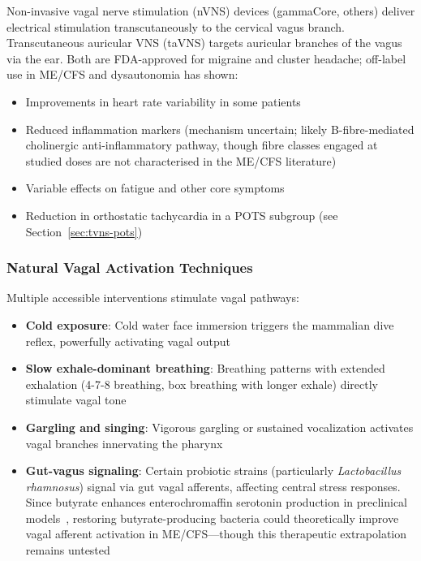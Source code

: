 Non-invasive vagal nerve stimulation (nVNS) devices (gammaCore, others) deliver electrical stimulation transcutaneously to the cervical vagus branch. Transcutaneous auricular VNS (taVNS) targets auricular branches of the vagus via the ear. Both are FDA-approved for migraine and cluster headache; off-label use in ME/CFS and dysautonomia has shown:
\begin{itemize}
    \item Improvements in heart rate variability in some patients
    \item Reduced inflammation markers (mechanism uncertain; likely B-fibre-mediated cholinergic anti-inflammatory pathway, though fibre classes engaged at studied doses are not characterised in the ME/CFS literature)
    \item Variable effects on fatigue and other core symptoms
    \item Reduction in orthostatic tachycardia in a POTS subgroup (see Section~\ref{sec:tvns-pots})
\end{itemize}

\subsubsection{Natural Vagal Activation Techniques}

Multiple accessible interventions stimulate vagal pathways:
\begin{itemize}
    \item \textbf{Cold exposure}: Cold water face immersion triggers the mammalian dive reflex, powerfully activating vagal output
    \item \textbf{Slow exhale-dominant breathing}: Breathing patterns with extended exhalation (4-7-8 breathing, box breathing with longer exhale) directly stimulate vagal tone
    \item \textbf{Gargling and singing}: Vigorous gargling or sustained vocalization activates vagal branches innervating the pharynx
    \item \textbf{Gut-vagus signaling}: Certain probiotic strains (particularly \textit{Lactobacillus rhamnosus}) signal via gut vagal afferents, affecting central stress responses. Since butyrate enhances enterochromaffin serotonin production in preclinical models~\cite{Barton2025}, restoring butyrate-producing bacteria could theoretically improve vagal afferent activation in ME/CFS---though this therapeutic extrapolation remains untested
\end{itemize}

